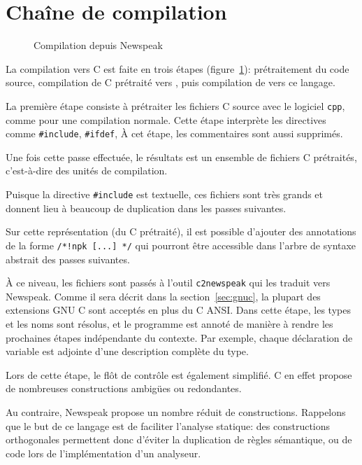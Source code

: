 \section{Chaîne de compilation}
\label{sec:compil}

\begin{figure}
  \centering
  
  \caption{Compilation depuis Newspeak}
\label{fig:compil-npk}
\end{figure}

La compilation vers C est faite en trois étapes (figure~\ref{fig:compil-npk}):
prétraitement du code source, compilation de C prétraité vers \newspeak{}, puis
compilation de \newspeak{} vers ce langage.

La première étape consiste à prétraiter les fichiers C source avec le logiciel
\texttt{cpp}, comme pour une compilation normale. Cette étape interprète les
directives comme \texttt{\#include}, \texttt{\#ifdef}, À cet étape, les
commentaires sont aussi supprimés.

Une fois cette passe effectuée, le résultats est un ensemble de fichiers C
prétraités, c'est-à-dire des unités de compilation.

Puisque la directive \texttt{\#include} est textuelle, ces fichiers sont très
grands et donnent lieu à beaucoup de duplication dans les passes suivantes.

Sur cette représentation (du C prétraité), il est possible d'ajouter des
annotations de la forme \texttt{/*!npk [...] */} qui pourront être accessible
dans l'arbre de syntaxe abstrait des passes suivantes.

À ce niveau, les fichiers sont passés à l'outil \texttt{c2newspeak} qui les
traduit vers Newspeak. Comme il sera décrit dans la section~\ref{sec:gnuc}, la
plupart des extensions GNU C sont acceptés en plus du C ANSI. Dans cette étape,
les types et les noms sont résolus, et le programme est annoté de manière à
rendre les prochaines étapes indépendante du contexte. Par exemple, chaque
déclaration de variable est adjointe d'une description complète du type.

Lors de cette étape, le flôt de contrôle est également simplifié. C en effet
propose de nombreuses constructions ambigües ou redondantes.

Au contraire, Newspeak propose un nombre réduit de constructions. Rappelons que
le but de ce langage est de faciliter l'analyse statique: des constructions
orthogonales permettent donc d'éviter la duplication de règles sémantique, ou de
code lors de l'implémentation d'un analyseur.


